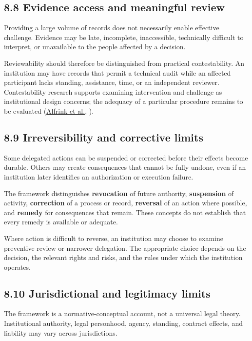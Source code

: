 \documentclass[
  10pt,
]{article}
\newcommand{\axCite}[2]{\hyperlink{cite.#1}{#2}, \citeyear{#1}}
\begin{document}
\subsection{8.8 Evidence access and meaningful
review}\label{evidence-access-and-meaningful-review}

Providing a large volume of records does not necessarily enable
effective challenge. Evidence may be late, incomplete, inaccessible,
technically difficult to interpret, or unavailable to the people
affected by a decision.

Reviewability should therefore be distinguished from practical
contestability. An institution may have records that permit a technical
audit while an affected participant lacks standing, assistance, time, or
an independent reviewer. Contestability research supports examining
intervention and challenge as institutional design concerns; the
adequacy of a particular procedure remains to be evaluated (\axCite{alfrink2023contestable}{Alfrink et al.}).

\subsection{8.9 Irreversibility and corrective
limits}\label{irreversibility-and-corrective-limits}

Some delegated actions can be suspended or corrected before their
effects become durable. Others may create consequences that cannot be
fully undone, even if an institution later identifies an authorization
or execution failure.

The framework distinguishes \textbf{revocation} of future authority,
\textbf{suspension} of activity, \textbf{correction} of a process or
record, \textbf{reversal} of an action where possible, and
\textbf{remedy} for consequences that remain. These concepts do not
establish that every remedy is available or adequate.

Where action is difficult to reverse, an institution may choose to
examine preventive review or narrower delegation. The appropriate choice
depends on the decision, the relevant rights and risks, and the rules
under which the institution operates.

\subsection{8.10 Jurisdictional and legitimacy
limits}\label{jurisdictional-and-legitimacy-limits}

The framework is a normative-conceptual account, not a universal legal
theory. Institutional authority, legal personhood, agency, standing,
contract effects, and liability may vary across jurisdictions.
\end{document}
